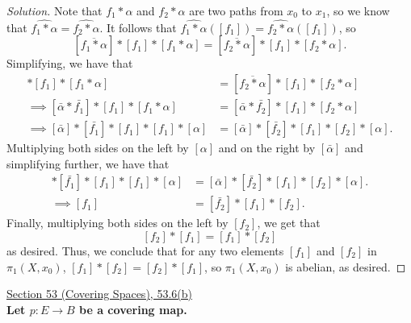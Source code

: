 \documentclass[11pt]{article}
\newenvironment{solution}
  {\renewcommand\qedsymbol{$\blacksquare$}\begin{proof}[Solution]}
  {\end{proof}}
\begin{document}
\begin{solution}
Note that $f_1 * \alpha$ and $f_2 * \alpha$ are two paths from $x_0$ to $x_1$, so we know that $\widehat{f_1 * \alpha} = \widehat{f_2 * \alpha}$. It follows that
$\widehat{f_1 * \alpha}([f_1]) = \widehat{f_2 * \alpha}([f_1])$, so
\[
    [\overline{f_1 * \alpha}] * [f_1] * [f_1 * \alpha] = [\overline{f_2 * \alpha}] * [f_1] * [f_2 * \alpha].
\]
Simplifying, we have that
\begin{align*}
    [\overline{f_1 * \alpha}] * [f_1] * [f_1 * \alpha] &= [\overline{f_2 * \alpha}] * [f_1] * [f_2 * \alpha] \\
    \implies [\bar{\alpha} * \bar{f_1}] * [f_1] * [f_1 * \alpha] &= [\bar{\alpha} * \bar{f_2}] * [f_1] * [f_2 * \alpha] \\
    \implies [\bar{\alpha}] * [\bar{f_1}] * [f_1] * [f_1] * [\alpha] &= [\bar{\alpha}] * [\bar{f_2}] * [f_1] * [f_2] * [\alpha].
\end{align*}
Multiplying both sides on the left by $[\alpha]$ and on the right by $[\bar{\alpha}]$ and simplifying further, we have that
\begin{align*}
    [\bar{\alpha}] * [\bar{f_1}] * [f_1] * [f_1] * [\alpha] &= [\bar{\alpha}] * [\bar{f_2}] * [f_1] * [f_2] * [\alpha]. \\
    \implies [f_1] &= [\bar{f_2}] * [f_1] * [f_2].
\end{align*}
Finally, multiplying both sides on the left by $[f_2]$, we get that 
\[
    [f_2] * [f_1] = [f_1] * [f_2]
\]
as desired. Thus, we conclude that for any two elements $[f_1]$ and $[f_2]$ in $\pi_1(X, x_0)$, $[f_1] * [f_2] = [f_2] * [f_1]$, so $\pi_1(X, x_0)$ is abelian, as desired.
\end{solution}

\newpage

\underline{Section 53 (Covering Spaces), 53.6(b)} \\

\textbf{Let $p\colon E \rightarrow B$ be a covering map.}
\end{document}
